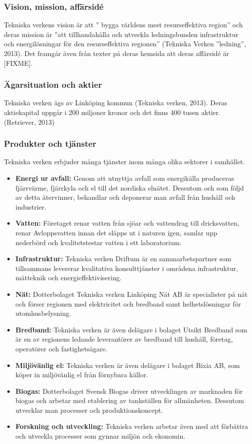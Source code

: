 \documentclass[10pt,a4paper]{article}
\begin{document}
\subsubsection{Vision, mission, affärsidé}
Tekniska verkens vision är att '' bygga världens mest resurseffektiva
region'' och deras mission är ''att tillhandahålla och utveckla
ledningsbunden infrastruktur och energilösningar för den
resurseffektiva regionen'' (Tekniska Verken ''ledning'', 2013). Det framgår även
från texter på deras hemsida att deras affärsidé är [FIXME].

\subsubsection{Ägarsituation och aktier}
Tekniska verken ägs av Linköping kommun (Tekniska verken, 2013). Deras
aktiekapital uppgår i 200 miljoner kronor och det finns 400 tusen
aktier.(Retriever, 2013)

\subsubsection{Produkter och tjänster} \label{prod}
Tekniska verken erbjuder många tjänster inom många olika sektorer i samhället.
\begin{itemize}
	\item \textbf{Energi ur avfall:} Genom att utnyttja avfall som energikälla
	produceras fjärrvärme, fjärrkyla och el till det nordiska elnätet. Dessutom och
	som följd av detta återvinner, behandlar och deponerar man avfall från hushåll
	och industrier.
	\item \textbf{Vatten:} Företaget renar vatten från sjöar och vattendrag till
	dricksvatten, renar Avloppsvatten innan det släpps ut i naturen igen, samlar
	upp nederbörd och kvalitetstestar vatten i ett laboratorium.
	\item \textbf{Infrastruktur:} Tekniska verken Driftum är en sammarbetspartner
	som tillsammans levererar kvalitativa konsulttjänster i områdena infrastruktur,
	mätteknik och energieffektivisering.
	\item \textbf{Nät:} Dotterbolaget Tekniska verken Linköping Nät AB är
	specialister på nät och förser regionen med elektricitet och bredband samt
	helhetslösningar för utomhusbelysning.
	\item \textbf{Bredband:} Tekniska verken är även delägare i bolaget Utsikt
	Bredband som är en av regionens ledande leverantörer av bredband till hushåll,
	företag, operatörer och fastighetsägare.
	\item \textbf{Miljövänlig el:} Tekniska verken är även delägare i bolaget Bixia
	AB, som köper in miljövänlig el från förnybara källor.
	\item \textbf{Biogas:} Dotterbolaget Svensk Biogas driver utvecklingen av
	marknaden för biogas och arbetar med etablering av tankställen för allmänheten.
	Dessutom utvecklar man processer och produktionskoncept.
	\item \textbf{Forskning och utveckling:} Tekniska verken arbetar även med att
	förbättra och utveckla processer som gynnar miljön och ekonomin.
\end{itemize}
\end{document}

